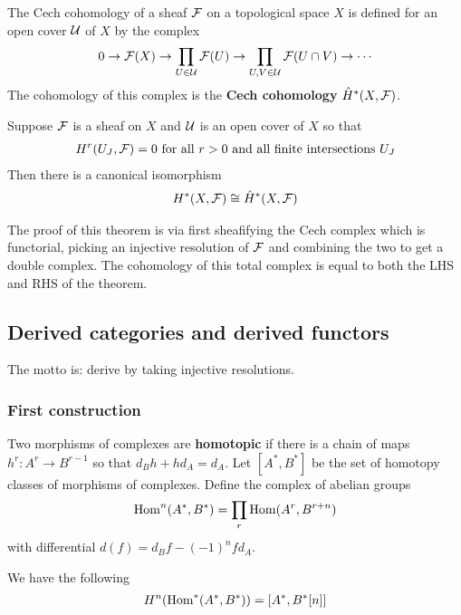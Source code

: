 \begin{definition}
    The Cech cohomology of a sheaf ${\mathcal{F}}$ on a topological space $X$ is defined for 
    an open cover ${\mathcal{U}}$ of $X$ by the complex \begin{align*}
        0 \to {\mathcal{F}}(X) \to \prod_{U\in {\mathcal{U}}} {\mathcal{F}}(U) \to \prod_{U,V\in {\mathcal{U}}} {\mathcal{F}}(U\cap V) \to \cdots
    \end{align*} The cohomology of this complex is the \textbf{Cech cohomology} $\hat H^*(X,{\mathcal{F}})$.
\end{definition}

\begin{theorem}
    Suppose ${\mathcal{F}}$ is a sheaf on $X$ and ${\mathcal{U}}$ is an open cover of $X$ so that \begin{align*}
        H^r(U_J,{\mathcal{F}}) = 0 \text{ for all $r>0$ and all finite intersections $U_J$}
    \end{align*} Then there is a canonical isomorphism
    \begin{align*}
        H^*(X,{\mathcal{F}}) \cong \hat H^*(X,{\mathcal{F}})
    \end{align*}
\end{theorem}

The proof of this theorem is via first sheafifying the Cech complex which is functorial, picking an injective resolution
of ${\mathcal{F}}$ and combining the two to get a double complex. The cohomology of this total complex is equal to 
both the LHS and RHS of the theorem.

\subsection{Derived categories and derived functors}
The motto is: derive by taking injective resolutions.
\subsubsection{First construction}
\begin{definition}
    Two morphisms of complexes are \textbf{homotopic} if there is a chain of maps
    $h^r:A^r\to B^{r-1}$ so that $d_Bh + hd_A = d_A$. Let $[A^*,B^*]$ be the set of homotopy classes
    of morphisms of complexes.
     Define the complex of abelian groups \begin{align}
        \operatorname{Hom}^n(A^*,B^*) = \prod_r \operatorname{Hom}(A^r,B^{r+n})
    \end{align} with differential $d(f) = d_Bf - (-1)^nf d_A$. 
\end{definition}
We have the following \begin{align*}
    H^n(\operatorname{Hom}^*(A^*,B^*)) = [A^*,B^*[n]]
\end{align*}


